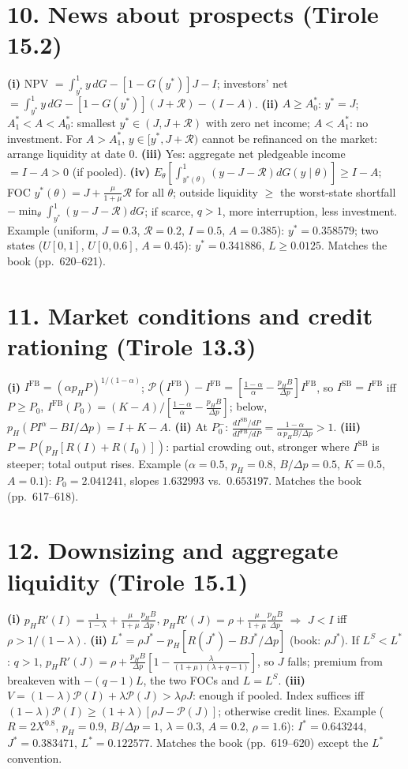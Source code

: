 \documentclass[11pt,a4paper]{article}
\newcommand{\Rc}{\mathcal{R}}
\newcommand{\Pc}{\mathcal{P}}
\begin{document}
\section*{10. News about prospects (Tirole 15.2)}
\textbf{(i)} NPV $=\int_{y^*}^1y\,dG-[1-G(y^*)]J-I$; investors' net $=\int_{y^*}^1y\,dG-[1-G(y^*)](J+\Rc)-(I-A)$.
\textbf{(ii)} $A\geq A_0^*$: $y^*=J$; $A_1^*<A<A_0^*$: smallest $y^*\in(J,J+\Rc)$ with zero net income; $A<A_1^*$: no investment. For $A>A_1^*$, $y\in[y^*,J+\Rc)$ cannot be refinanced on the market: arrange liquidity at date 0.
\textbf{(iii)} Yes: aggregate net pledgeable income $=I-A>0$ (if pooled).
\textbf{(iv)} $E_\theta[\int_{y^*(\theta)}^1(y-J-\Rc)dG(y\mid\theta)]\geq I-A$; FOC $y^*(\theta)=J+\frac{\mu}{1+\mu}\Rc$ for all $\theta$; outside liquidity $\geq$ the worst-state shortfall $-\min_\theta\int_{y^*}^1(y-J-\Rc)dG$; if scarce, $q>1$, more interruption, less investment.
Example (uniform, $J=0.3$, $\Rc=0.2$, $I=0.5$, $A=0.385$): $y^*=0.358579$; two states ($U[0,1]$, $U[0,0.6]$, $A=0.45$): $y^*=0.341886$, $L\geq0.0125$. Matches the book (pp.~620--621).

\section*{11. Market conditions and credit rationing (Tirole 13.3)}
\textbf{(i)} $I^{\text{FB}}=(\alpha p_HP)^{1/(1-\alpha)}$; $\Pc(I^{\text{FB}})-I^{\text{FB}}=[\frac{1-\alpha}{\alpha}-\frac{p_HB}{\Delta p}]I^{\text{FB}}$, so $I^{\text{SB}}=I^{\text{FB}}$ iff $P\geq P_0$, $I^{\text{FB}}(P_0)=(K-A)/[\frac{1-\alpha}\alpha-\frac{p_HB}{\Delta p}]$; below, $p_H(PI^\alpha-BI/\Delta p)=I+K-A$.
\textbf{(ii)} At $P_0^-$: $\frac{dI^{\text{SB}}/dP}{dI^{\text{FB}}/dP}=\frac{1-\alpha}{\alpha\,p_HB/\Delta p}>1$.
\textbf{(iii)} $P=P(p_H[R(I)+R(I_0)])$: partial crowding out, stronger where $I^{\text{SB}}$ is steeper; total output rises.
Example ($\alpha=0.5$, $p_H=0.8$, $B/\Delta p=0.5$, $K=0.5$, $A=0.1$): $P_0=2.041241$, slopes $1.632993$ vs.\ $0.653197$. Matches the book (pp.~617--618).

\section*{12. Downsizing and aggregate liquidity (Tirole 15.1)}
\textbf{(i)} $p_HR'(I)=\frac{1}{1-\lambda}+\frac{\mu}{1+\mu}\frac{p_HB}{\Delta p}$, $p_HR'(J)=\rho+\frac{\mu}{1+\mu}\frac{p_HB}{\Delta p}$ $\Rightarrow$ $J<I$ iff $\rho>1/(1-\lambda)$.
\textbf{(ii)} $L^*=\rho J^*-p_H[R(J^*)-BJ^*/\Delta p]$ (book: $\rho J^*$). If $L^S<L^*$: $q>1$, $p_HR'(J)=\rho+\frac{p_HB}{\Delta p}[1-\frac{\lambda}{(1+\mu)(\lambda+q-1)}]$, so $J$ falls; premium from breakeven with $-(q-1)L$, the two FOCs and $L=L^S$.
\textbf{(iii)} $V=(1-\lambda)\Pc(I)+\lambda\Pc(J)>\lambda\rho J$: enough if pooled. Index suffices iff $(1-\lambda)\Pc(I)\geq(1+\lambda)[\rho J-\Pc(J)]$; otherwise credit lines.
Example ($R=2X^{0.8}$, $p_H=0.9$, $B/\Delta p=1$, $\lambda=0.3$, $A=0.2$, $\rho=1.6$): $I^*=0.643244$, $J^*=0.383471$, $L^*=0.122577$. Matches the book (pp.~619--620) except the $L^*$ convention.
\end{document}
